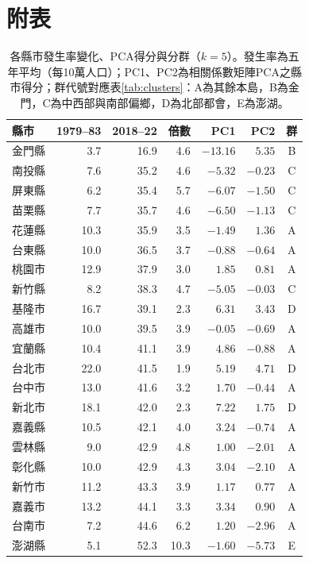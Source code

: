 \documentclass[UTF8,a4paper,11pt]{ctexart}
\begin{document}
\section{附表}
\begin{table}[H]
\centering
\caption{各縣市發生率變化、PCA得分與分群（$k=5$）。發生率為五年平均（每10萬人口）；PC1、PC2為相關係數矩陣PCA之縣市得分；群代號對應表\ref{tab:clusters}：A為其餘本島，B為金門，C為中西部與南部偏鄉，D為北部都會，E為澎湖。}\label{tab:counties}
\small
\begin{tabular}{lrrrrrc}
\toprule
縣市 & 1979--83 & 2018--22 & 倍數 & PC1 & PC2 & 群\\
\midrule
金門縣 & 3.7 & 16.9 & 4.6 & $-13.16$ & $5.35$ & B\\
南投縣 & 7.6 & 35.2 & 4.6 & $-5.32$ & $-0.23$ & C\\
屏東縣 & 6.2 & 35.4 & 5.7 & $-6.07$ & $-1.50$ & C\\
苗栗縣 & 7.7 & 35.7 & 4.6 & $-6.50$ & $-1.13$ & C\\
花蓮縣 & 10.3 & 35.9 & 3.5 & $-1.49$ & $1.36$ & A\\
台東縣 & 10.0 & 36.5 & 3.7 & $-0.88$ & $-0.64$ & A\\
桃園市 & 12.9 & 37.9 & 3.0 & $1.85$ & $0.81$ & A\\
新竹縣 & 8.2 & 38.3 & 4.7 & $-5.05$ & $-0.03$ & C\\
基隆市 & 16.7 & 39.1 & 2.3 & $6.31$ & $3.43$ & D\\
高雄市 & 10.0 & 39.5 & 3.9 & $-0.05$ & $-0.69$ & A\\
宜蘭縣 & 10.4 & 41.1 & 3.9 & $4.86$ & $-0.88$ & A\\
台北市 & 22.0 & 41.5 & 1.9 & $5.19$ & $4.71$ & D\\
台中市 & 13.0 & 41.6 & 3.2 & $1.70$ & $-0.44$ & A\\
新北市 & 18.1 & 42.0 & 2.3 & $7.22$ & $1.75$ & D\\
嘉義縣 & 10.5 & 42.1 & 4.0 & $3.24$ & $-0.74$ & A\\
雲林縣 & 9.0 & 42.9 & 4.8 & $1.00$ & $-2.01$ & A\\
彰化縣 & 10.0 & 42.9 & 4.3 & $3.04$ & $-2.10$ & A\\
新竹市 & 11.2 & 43.3 & 3.9 & $1.17$ & $0.77$ & A\\
嘉義市 & 13.2 & 44.1 & 3.3 & $3.34$ & $0.90$ & A\\
台南市 & 7.2 & 44.6 & 6.2 & $1.20$ & $-2.96$ & A\\
澎湖縣 & 5.1 & 52.3 & 10.3 & $-1.60$ & $-5.73$ & E\\
\bottomrule
\end{tabular}
\end{table}
\end{document}
